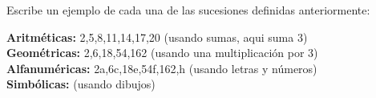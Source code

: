 
\question Escribe un ejemplo de cada una de las sucesiones definidas
          anteriormente:
  \begin{solution}[4cm]
    \textbf{Aritméticas:} 2,5,8,11,14,17,20 (usando sumas, aqui suma 3) \\
    \textbf{Geométricas:}  2,6,18,54,162 (usando una multiplicación por 3) \\
    \textbf{Alfanuméricas:} 2a,6c,18e,54f,162,h (usando letras y números) \\
    \textbf{Simbólicas:} (usando dibujos)
  \end{solution}
